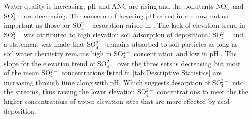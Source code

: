 Water quality is increasing.  
pH and ANC are rising and the pollutants NO$_3^-$ and SO$_4^{2-}$ are decreasing.  
The concerns of lowering pH raised in \citet{robinson2008ph} are now not as important as those for SO$_4^{2-}$ desorption raised in \citet{cai2013}.  
The lack of elevation trend in SO$_4^{2-}$ was attributed to high elevation soil adsorption of depositional SO$_4^{2-}$ and a statement was made that SO$_4^{2-}$ remains absorbed to soil particles as long as soil water chemistry remains high in SO$_4^{2-}$ concentration and low in pH \citep{cai2011long}.  
The slope for the elevation trend of SO$_4^{2-}$ over the three sets is decreasing but most of the mean SO$_4^{2-}$ concentrations listed in \autoref{tab:Descriptive Statistics} are increasing through time along with pH.
Which suggests desorption of SO$_4^{2-}$ into the streams, thus raising the lower elevation SO$_4^{2-}$ concentrations to meet the the higher concentrations of upper elevation sites that are more effected by acid deposition.


  
